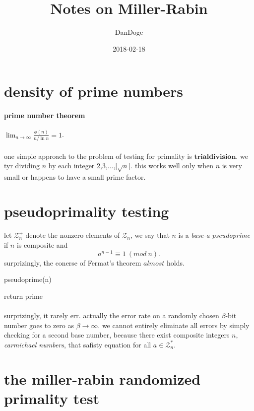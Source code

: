 \documentclass{article}
\title{Notes on Miller-Rabin}
\date{2018-02-18}
\author{DanDoge}
\begin{document}
\section{density of prime numbers}
  \paragraph{prime number theorem} $\lim_{n \to \infty} \frac{\phi(n)}{n / \ln n} = 1$.
  \paragraph{} one simple approach to the problem of testing for primality is $\mathbf{trial division}$. we tyr dividing $n$ by each integer 2,3,...,[$\sqrt{n}$]. this works well only when $n$ is very small or happens to have a small prime factor.
\section{pseudoprimality testing}
  \paragraph{} let $\mathcal{Z}_n^+$ denote the nonzero elements of $\mathcal{Z}_n$, we say that $n$ is a \textit{base-a pseudoprime} if $n$ is composite and
  \begin{equation}
    a^{n - 1} \equiv 1\ (mod\ n).
  \end{equation}
  surprizingly, the conerse of Fermat's theorem $almost$ holds.
  \begin{algorithm}
    \caption{pseudoprime(n)}
    \begin{algorithmic}[1]
      \State {}
      \Else return prime
      \EndIf
    \end{algorithmic}
  \end{algorithm}
  \paragraph{} surprizingly, it rarely err. actually the error rate on a randomly chosen $\beta$-bit number goes to zero as $\beta \to \infty$. we cannot entirely eliminate all errors by simply checking for a second base number, because there exist composite integers $n$, \textit{carmichael numbers}, that safisty equation for all $a \in \mathcal{Z}_n^*$.
\section{the miller-rabin randomized primality test}
\end{document}
